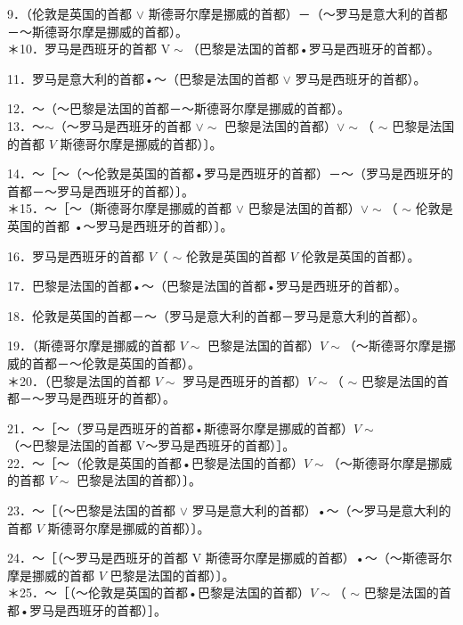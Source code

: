 9．（伦敦是英国的首都 $\vee$ 斯德哥尔摩是挪威的首都）－（～罗马是意大利的首都－～斯德哥尔摩是挪威的首都）。\\
＊10．罗马是西班牙的首都 $\mathrm{V} \sim$（巴黎是法国的首都•罗马是西班牙的首都）。

11．罗马是意大利的首都•～（巴黎是法国的首都 $\vee$ 罗马是西班牙的首都）。

12．～（～巴黎是法国的首都－～斯德哥尔摩是挪威的首都）。\\
13．～$\sim$（～罗马是西班牙的首都 $\vee \sim$ 巴黎是法国的首都）$\vee \sim$（ $\sim$ 巴黎是法国的首都 $V$ 斯德哥尔摩是挪威的首都）〕。

14．～［～（～伦敦是英国的首都•罗马是西班牙的首都）－～（罗马是西班牙的首都－～罗马是西班牙的首都）〕。\\
＊15．～［～（斯德哥尔摩是挪威的首都 $\vee$ 巴黎是法国的首都）$\vee \sim$（ $\sim$ 伦敦是英国的首都 •～罗马是西班牙的首都）〕。

16．罗马是西班牙的首都 $V$（ $\sim$ 伦敦是英国的首都 $V$ 伦敦是英国的首都）。

17．巴黎是法国的首都•～（巴黎是法国的首都•罗马是西班牙的首都）。

18．伦敦是英国的首都－～（罗马是意大利的首都－罗马是意大利的首都）。

19．（斯德哥尔摩是挪威的首都 $V \sim$ 巴黎是法国的首都）$V \sim$（～斯德哥尔摩是挪威的首都－～伦敦是英国的首都）。\\
＊20．（巴黎是法国的首都 $V \sim$ 罗马是西班牙的首都）$V \sim$（ $\sim$ 巴黎是法国的首都－～罗马是西班牙的首都）。

21．～［～（罗马是西班牙的首都•斯德哥尔摩是挪威的首都）$V \sim$\\
（～巴黎是法国的首都 V～罗马是西班牙的首都）］。\\
22．～［～（伦敦是英国的首都•巴黎是法国的首都）$V \sim$（～斯德哥尔摩是挪威的首都 $V \sim$ 巴黎是法国的首都）〕。

23．～［（～巴黎是法国的首都 $\vee$ 罗马是意大利的首都）•～（～罗马是意大利的首都 $V$ 斯德哥尔摩是挪威的首都）〕。

24．～［（～罗马是西班牙的首都 V 斯德哥尔摩是挪威的首都）•～（～斯德哥尔摩是挪威的首都 $V$ 巴黎是法国的首都）〕。\\
＊25．～［（～伦敦是英国的首都•巴黎是法国的首都）$V \sim$（ $\sim$ 巴黎是法国的首都•罗马是西班牙的首都）］。

